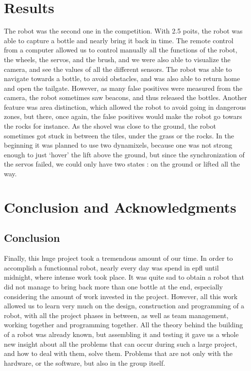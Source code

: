 \chapter{Results}
The robot was the second one in the competition. With 2.5 poits, the robot was able to capture a bottle and nearly bring it back in time. The remote control from a computer allowed us to control manually all the functions of the robot, the wheels, the servos, and the brush, and we were also able to visualize the camera, and see the values of all the different sensors. The robot was able to navigate towards a bottle, to avoid obstacles, and was also able to return home and open the tailgate. However, as many false positives were measured from the camera, the robot sometimes saw beacons, and thus released the bottles. Another feature was area distinction, which allowed the robot to avoid going in dangerous zones, but there, once again, the false positives would make the robot go towars the rocks for instance. As the shovel was close to the ground, the robot sometimes got stuck in between the tiles, under the grass or the rocks. In the beginning it was planned to use two dynamixels, because one was not strong enough to just `hover' the lift above the ground, but since the synchronization of the servos failed, we could only have two states : on the ground or lifted all the way.

\chapter{Conclusion and Acknowledgments}

\section{Conclusion}
Finally, this huge project took a tremendous amount of our time. In order to accomplish a functionnal robot, nearly every day was spend in epfl until midnight, where intense work took place. It was quite sad to obtain a robot that did not manage to bring back more than one bottle at the end, especially considering the amount of work invested in the project. However, all this work allowed us to learn very much on the design, construction and programming of a robot, with all the project phases in between, as well as team management, working together and programming together. All the theory behind the building of a robot was already known, but assembling it and testing it gave us a whole new insight about all the problems that can occur during such a large project, and how to deal with them, solve them. Problems that are not only with the hardware, or the software, but also in the group itself. \\

